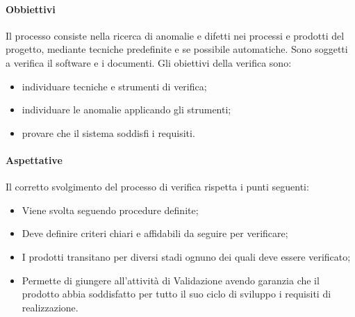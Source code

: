             \paragraph{Obbiettivi}
                Il processo consiste nella ricerca di anomalie e difetti nei processi e prodotti del progetto, mediante tecniche predefinite e se possibile automatiche. Sono soggetti a verifica il software e i documenti. Gli obiettivi della verifica sono:
                \begin{itemize}
                    \item  individuare tecniche e strumenti di verifica;
                    \item  individuare le anomalie applicando gli strumenti;
                    \item  provare che il sistema soddisfi i requisiti.
                \end{itemize}
            \paragraph{Aspettative}
                Il corretto svolgimento del processo di verifica rispetta i punti seguenti:\\
                \begin{itemize}
                    \item  Viene svolta seguendo procedure definite;
                    \item  Deve definire criteri chiari e affidabili da seguire per verificare;
                    \item  I prodotti transitano per diversi stadi ognuno dei quali deve essere verificato;
                    \item  Permette di giungere all’attività di Validazione avendo garanzia che il prodotto abbia soddisfatto per tutto il suo ciclo di sviluppo i requisiti di realizzazione.
                \end{itemize}
                
